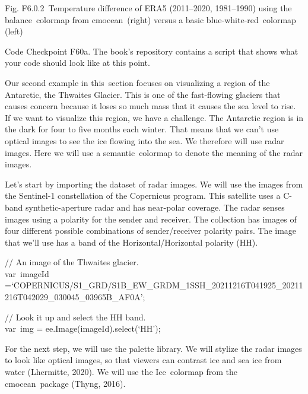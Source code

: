 \documentclass[
  letterpaper,
  DIV=11,
  numbers=noendperiod]{scrreprt}
\begin{document}
Fig. F6.0.2~Temperature difference of ERA5 (2011--2020, 1981--1990)
using the balance~colormap from cmocean~(right) versus a basic
blue-white-red~colormap (left)

\begin{tcolorbox}[enhanced jigsaw, left=2mm, breakable, rightrule=.15mm, opacityback=0, colframe=quarto-callout-note-color-frame, colbacktitle=quarto-callout-note-color!10!white, arc=.35mm, opacitybacktitle=0.6, toptitle=1mm, colback=white, leftrule=.75mm, title=\textcolor{quarto-callout-note-color}{\faInfo}\hspace{0.5em}{Note}, toprule=.15mm, bottomtitle=1mm, titlerule=0mm, bottomrule=.15mm, coltitle=black]

Code Checkpoint F60a. The book's repository contains a script that shows
what your code should look like at this point.

\end{tcolorbox}

Our second example in this~section focuses on visualizing a region of
the Antarctic, the Thwaites Glacier. This is one of the fast-flowing
glaciers that causes concern because it loses so much mass that it
causes the sea level to rise. If we want to visualize this region, we
have a challenge. The Antarctic region is in the dark for four to five
months each winter. That means that we can't use optical images to see
the ice flowing into the sea. We therefore will use radar images. Here
we will use a semantic~colormap to denote the meaning of the radar
images.

Let's start by importing the dataset of radar images. We will use the
images from the Sentinel-1 constellation of the Copernicus program. This
satellite uses a C-band synthetic-aperture radar and has near-polar
coverage. The radar senses images using a polarity for the sender and
receiver. The collection has images of four different possible
combinations of sender/receiver polarity pairs. The image that we'll use
has a band of the Horizontal/Horizontal polarity (HH).

// An image of the Thwaites glacier.\\
var~imageId
=`COPERNICUS/S1\_GRD/S1B\_EW\_GRDM\_1SSH\_20211216T041925\_20211216T042029\_030045\_03965B\_AF0A';

// Look it up and select the HH band.\\
var~img = ee.Image(imageId).select(`HH');

For the next step, we will use the palette library. We will stylize the
radar images to look like optical images, so that viewers can contrast
ice and sea ice from water (Lhermitte, 2020). We will use the
Ice~colormap from the cmocean~package (Thyng, 2016).
\end{document}
